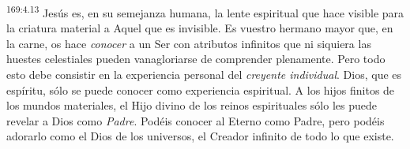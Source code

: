 \par 
\textsuperscript{169:4.13} Jesús es, en su semejanza humana, la lente espiritual que hace visible para la criatura material a Aquel que es invisible. Es vuestro hermano mayor que, en la carne, os hace \textit{conocer} a un Ser con atributos infinitos que ni siquiera las huestes celestiales pueden vanagloriarse de comprender plenamente. Pero todo esto debe consistir en la experiencia personal del \textit{creyente individual}. Dios, que es espíritu, sólo se puede conocer como experiencia espiritual. A los hijos finitos de los mundos materiales, el Hijo divino de los reinos espirituales sólo les puede revelar a Dios como \textit{Padre}. Podéis conocer al Eterno como Padre, pero podéis adorarlo como el Dios de los universos, el Creador infinito de todo lo que existe.